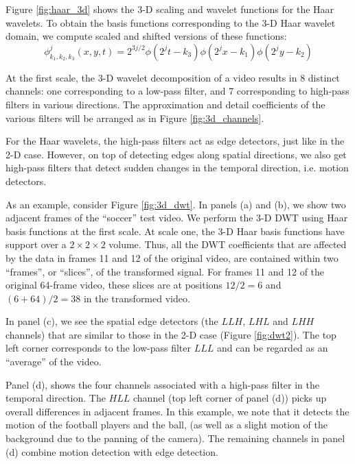 Figure \ref{fig:haar_3d} shows the 3-D scaling and wavelet functions for the Haar wavelets.
To obtain the basis functions corresponding to the 3-D Haar wavelet domain, we compute scaled and shifted versions of these functions:%
\begin{equation*}
  \phi_{k_1,k_2,k_3}^j(x,y,t) = 2^{3j/2} \phi(2^j t - k_3)\phi(2^j x - k_1) \phi(2^j y - k_2)
\end{equation*}

At the first scale, the 3-D wavelet decomposition of a video results in 8 distinct channels: one corresponding to a low-pass filter, and 7 corresponding to high-pass filters in various directions.
The approximation and detail coefficients of the various filters will be arranged as in Figure \ref{fig:3d_channels}.

For the Haar wavelets, the high-pass filters act as edge detectors, just like in the 2-D case. 
However, on top of detecting edges along spatial directions, we also get high-pass filters that detect sudden changes in the temporal direction, i.e. motion detectors.

As an example, consider Figure \ref{fig:3d_dwt}.
In panels (a) and (b), we show two adjacent frames of the ``soccer'' test video.
We perform the 3-D DWT using Haar basis functions at the first scale.
At scale one, the 3-D Haar basis functions have support over a $2\times 2\times 2$ volume.
Thus, all the DWT coefficients that are affected by the data in frames 11 and 12 of the original video, are contained within two ``frames'', or ``slices'', of the transformed signal.
For frames 11 and 12 of the original 64-frame video, these slices are at positions $12/2=6$ and $(6+64)/2=38$ in the transformed video.

In panel (c), we see the spatial edge detectors (the $LLH$, $LHL$ and $LHH$ channels) that are similar to those in the 2-D case (Figure \ref{fig:dwt2}).
The top left corner corresponds to the low-pass filter $LLL$ and can be regarded as an ``average'' of the video.

Panel (d), shows the four channels associated with a high-pass filter in the temporal direction.
The $HLL$ channel (top left corner of panel (d)) picks up overall differences in adjacent frames.
In this example, we note that it detects the motion of the football players and the ball, (as well as a slight motion of the background due to the panning of the camera).
The remaining channels in panel (d) combine motion detection with edge detection.






